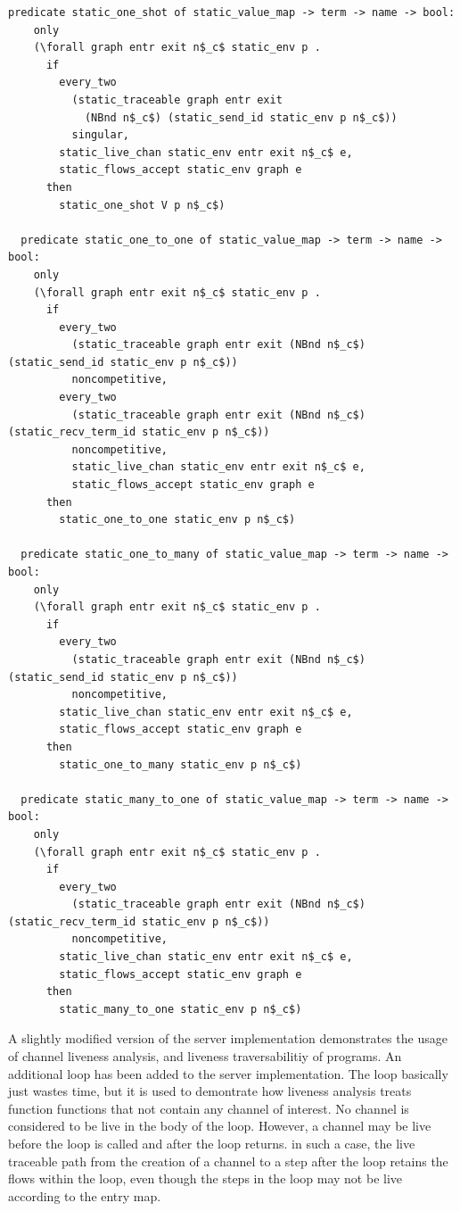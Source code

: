 \documentclass[10pt]{article}
\begin{document}
\begin{lstlisting}[language=logic, mathescape]
  predicate static_one_shot of static_value_map -> term -> name -> bool:
    only
    (\forall graph entr exit n$_c$ static_env p . 
      if
        every_two
          (static_traceable graph entr exit
            (NBnd n$_c$) (static_send_id static_env p n$_c$))
          singular, 
        static_live_chan static_env entr exit n$_c$ e, 
        static_flows_accept static_env graph e
      then
        static_one_shot V p n$_c$)

  predicate static_one_to_one of static_value_map -> term -> name -> bool:
    only
    (\forall graph entr exit n$_c$ static_env p .
      if
        every_two
          (static_traceable graph entr exit (NBnd n$_c$) (static_send_id static_env p n$_c$))
          noncompetitive, 
        every_two
          (static_traceable graph entr exit (NBnd n$_c$) (static_recv_term_id static_env p n$_c$))
          noncompetitive,
          static_live_chan static_env entr exit n$_c$ e,
          static_flows_accept static_env graph e
      then
        static_one_to_one static_env p n$_c$)

  predicate static_one_to_many of static_value_map -> term -> name -> bool:
    only
    (\forall graph entr exit n$_c$ static_env p .
      if
        every_two
          (static_traceable graph entr exit (NBnd n$_c$) (static_send_id static_env p n$_c$))
          noncompetitive,
        static_live_chan static_env entr exit n$_c$ e,
        static_flows_accept static_env graph e
      then
        static_one_to_many static_env p n$_c$)

  predicate static_many_to_one of static_value_map -> term -> name -> bool:
    only
    (\forall graph entr exit n$_c$ static_env p .
      if
        every_two
          (static_traceable graph entr exit (NBnd n$_c$) (static_recv_term_id static_env p n$_c$))
          noncompetitive, 
        static_live_chan static_env entr exit n$_c$ e,
        static_flows_accept static_env graph e
      then
        static_many_to_one static_env p n$_c$)
  \end{lstlisting}


A slightly modified version of the server implementation demonstrates the usage of channel liveness
analysis, and liveness traversabilitiy of programs.  An additional loop has been added to the
server implementation.  The loop basically just wastes time, but it is used to demontrate how
liveness analysis treats function functions that not contain
any channel of interest.  No channel is
considered to be live in the body of the loop.  However, a channel may be live before the loop is
called and after the loop returns.  in such a case, the live traceable path from the creation of a
channel to a step after the loop retains the flows within the loop, even though the steps in
the loop may not be live according to the entry map.
\end{document}
